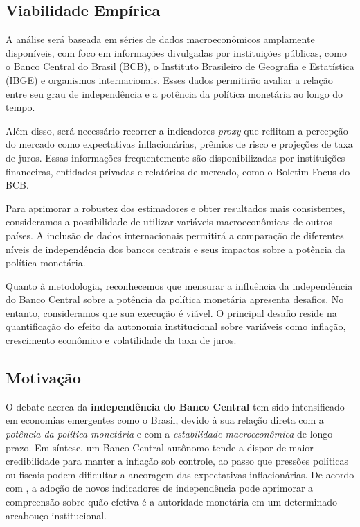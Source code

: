 \documentclass[a4paper,12pt]{article}[abnt2]
\begin{document}
\subsection{\textbf{Viabilidade Empírica}}  

A análise será baseada em séries de dados macroeconômicos amplamente disponíveis, com foco em informações divulgadas por instituições públicas, como o Banco Central do Brasil (BCB), o Instituto Brasileiro de Geografia e Estatística (IBGE) e organismos internacionais. Esses dados permitirão avaliar a relação entre seu grau de independência e a potência da política monetária ao longo do tempo.  

Além disso, será necessário recorrer a indicadores \textit{proxy} que reflitam a percepção do mercado como expectativas inflacionárias, prêmios de risco e projeções de taxa de juros. Essas informações frequentemente são disponibilizadas por instituições financeiras, entidades privadas e relatórios de mercado, como o Boletim Focus do BCB.  

Para aprimorar a robustez dos estimadores e obter resultados mais consistentes, consideramos a possibilidade de utilizar variáveis macroeconômicas de outros países. A inclusão de dados internacionais permitirá a comparação de diferentes níveis de independência dos bancos centrais e seus impactos sobre a potência da política monetária.

Quanto à metodologia, reconhecemos que mensurar a influência da independência do Banco Central sobre a potência da política monetária apresenta desafios. No entanto, consideramos que sua execução é viável. O principal desafio reside na quantificação do efeito da autonomia institucional sobre variáveis como inflação, crescimento econômico e volatilidade da taxa de juros.

\subsection{\textbf{Motivação}}
O debate acerca da \textbf{independência do Banco Central} tem sido intensificado em economias emergentes como o Brasil, devido à sua relação direta com a \emph{potência da política monetária} e com a \emph{estabilidade macroeconômica} de longo prazo. Em síntese, um Banco Central autônomo tende a dispor de maior credibilidade para manter a inflação sob controle, ao passo que pressões políticas ou fiscais podem dificultar a ancoragem das expectativas inflacionárias. De acordo com \cite{adrian2024}, a adoção de novos indicadores de independência pode aprimorar a compreensão sobre quão efetiva é a autoridade monetária em um determinado arcabouço institucional.
\end{document}
